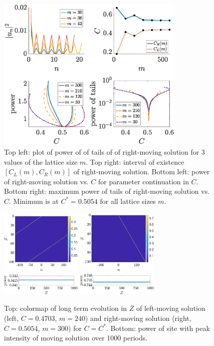 \documentclass[reprint, amsmath,amssymb,aps,pre]{revtex4-2}
\begin{document}
\begin{figure}
    \centering
    \includegraphics[width=9cm]{rightdiag.eps}
    \caption{Top left: plot of power of of tails of of right-moving solution for 3 values of the lattice size $m$. Top right: interval of existence $[C_L(m),C_R(m)]$ of right-moving solution. Bottom left: power of right-moving solution vs. $C$ for parameter continuation in $C$. Bottom right: maximum power of tails of right-moving solution vs. $C$. Minimum is at $C^* = 0.5054$ for all lattice sizes $m$.}
    \label{fig:rightdiag}
\end{figure}

\begin{figure}
    \centering
    \includegraphics[width=3.90cm]{leftlong.eps}
    \includegraphics[width=3.90cm]{rightlong.eps}
    \includegraphics[width=3.90cm]{leftperiods.eps}
    \includegraphics[width=3.90cm]{rightperiods.eps}
    \caption{Top: colormap of long term evolution in $Z$ of left-moving solution (left, $C=0.4703$, $m=240$) and right-moving solution (right, $C=0.5054$, $m=300$) for $C=C^*$. Bottom: power of site with peak intensity of moving solution over 1000 periods.}
    \label{fig:movelong}
\end{figure}
\end{document}
